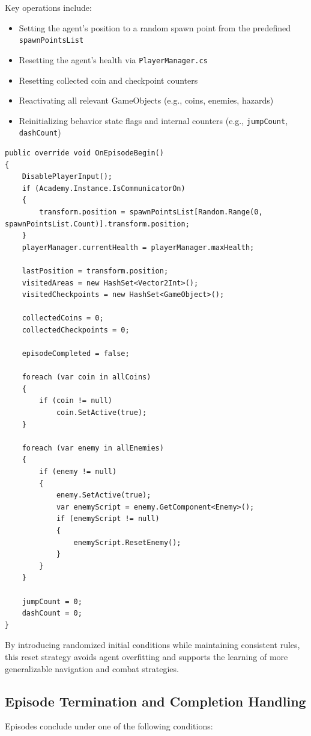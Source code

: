 \documentclass[12pt,oneside,openright,a4paper]{cpe-english-project}
\begin{document}
Key operations include:

\begin{itemize}
\item Setting the agent’s position to a random spawn point from the predefined \texttt{spawnPointsList}
\item Resetting the agent’s health via \texttt{PlayerManager.cs}
\item Resetting collected coin and checkpoint counters
\item Reactivating all relevant GameObjects (e.g., coins, enemies, hazards)
\item Reinitializing behavior state flags and internal counters (e.g., \texttt{jumpCount}, \texttt{dashCount})
\end{itemize}

\begin{lstlisting}[language={[Sharp]C}]
public override void OnEpisodeBegin()
{
	DisablePlayerInput();
	if (Academy.Instance.IsCommunicatorOn)
	{
		transform.position = spawnPointsList[Random.Range(0, spawnPointsList.Count)].transform.position;
	}
	playerManager.currentHealth = playerManager.maxHealth;

	lastPosition = transform.position;
	visitedAreas = new HashSet<Vector2Int>();
	visitedCheckpoints = new HashSet<GameObject>();
	
	collectedCoins = 0;
	collectedCheckpoints = 0;
	
	episodeCompleted = false;
	
	foreach (var coin in allCoins)
	{
		if (coin != null)
			coin.SetActive(true);
	}
	
	foreach (var enemy in allEnemies)
	{
		if (enemy != null)
		{
			enemy.SetActive(true);
			var enemyScript = enemy.GetComponent<Enemy>();
			if (enemyScript != null)
			{
				enemyScript.ResetEnemy();
			}
		}
	}
	
	jumpCount = 0;
	dashCount = 0;
}
\end{lstlisting}

By introducing randomized initial conditions while maintaining consistent rules, this reset strategy avoids agent overfitting and supports the learning of more generalizable navigation and combat strategies.

\subsection{Episode Termination and Completion Handling}

Episodes conclude under one of the following conditions:
\end{document}
